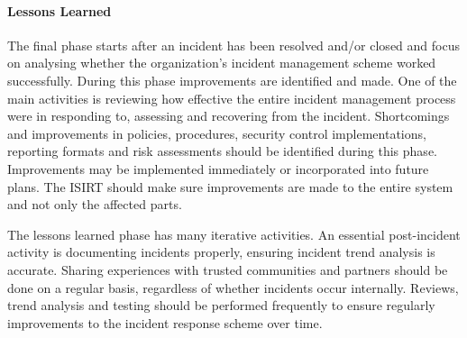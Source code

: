 \paragraph{Lessons Learned} The final phase starts after an incident has been resolved and/or closed and focus on analysing whether the organization's incident management scheme worked successfully. During this phase improvements are identified and made. One of the main activities is reviewing how effective the entire incident management process were in responding to, assessing and recovering from the incident. Shortcomings and improvements in policies, procedures, security control implementations, reporting formats and risk assessments should be identified during this phase. Improvements may be implemented immediately or incorporated into future plans. The ISIRT should make sure improvements are made to the entire system and not only the affected parts.

The lessons learned phase has many iterative activities. An essential post-incident activity is documenting incidents properly, ensuring incident trend analysis is accurate. Sharing experiences with trusted communities and partners should be done on a regular basis, regardless of whether incidents occur internally. Reviews, trend analysis and testing should be performed frequently to ensure regularly improvements to the incident response scheme over time. 




